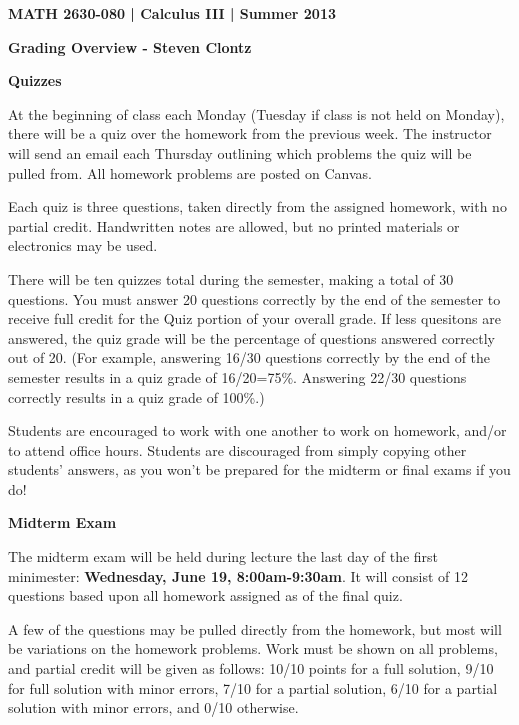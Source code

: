\newcommand{\CourseCode}{ 
MATH 2630-080
}
\newcommand{\CourseName}{
Calculus III
}
\newcommand{\Semester}{
Summer 2013
}





\begin{center}
\textbf{\large \CourseCode | \CourseName | \Semester}

\textbf{Grading Overview - Steven Clontz}
\end{center}

\textbf{\large Quizzes}

At the beginning of class each Monday (Tuesday if class is not held on Monday), there will be a quiz over the homework from the previous week. The instructor will send an email each Thursday outlining which problems the quiz will be pulled from. All homework problems are posted on Canvas.

Each quiz is three questions, taken directly from the assigned homework, with no partial credit. Handwritten notes are allowed, but no printed materials or electronics may be used.

There will be ten quizzes total during the semester, making a total of 30 questions. You must answer 20 questions correctly by the end of the semester to receive full credit for the Quiz portion of your overall grade. If less quesitons are answered, the quiz grade will be the percentage of questions answered correctly out of 20. (For example, answering 16/30 questions correctly by the end of the semester results in a quiz grade of 16/20=75\%. Answering 22/30 questions correctly results in a quiz grade of 100\%.)

Students are encouraged to work with one another to work on homework, and/or to attend office hours. Students are discouraged from simply copying other students’ answers, as you won’t be prepared for the midterm or final exams if you do!

\textbf{\large Midterm Exam}

The midterm exam will be held during lecture the last day of the first minimester: \textbf{Wednesday, June 19, 8:00am-9:30am}. It will consist of 12 questions based upon all homework assigned as of the final quiz.

A few of the questions may be pulled directly from the homework, but most will be variations on the homework problems. Work must be shown on all problems, and partial credit will be given as follows: 10/10 points for a full solution, 9/10 for full solution with minor errors, 7/10 for a partial solution, 6/10 for a partial solution with minor errors, and 0/10 otherwise.

